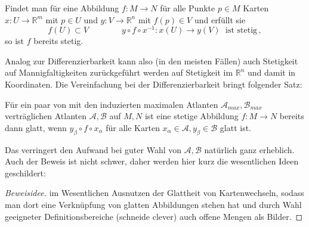 \documentclass[../H_Analysis_main.tex]{subfiles}
\begin{document}
\begin{satz}
Findet man für eine Abbildung $f: M \rightarrow N$ für alle Punkte $p \in M$ Karten $x: U \rightarrow \mathbb{R}^m$ mit $p \in U$ und $y: V \rightarrow \mathbb{R}^n$ mit $f(p) \in V$ und erfüllt sie
\begin{equation}
f(U) \subset V \qquad \qquad y \circ f \circ x^{-1}: x(U) \rightarrow y(V) \; \text{ ist stetig} \, ,
\end{equation}
so ist $f$ bereits stetig.
\end{satz}
Analog zur Differenzierbarkeit kann also (in den meisten Fällen) auch Stetigkeit auf Mannigfaltigkeiten zurückgeführt werden auf Stetigkeit im $\mathbb{R}^n$ und damit in Koordinaten. Die Vereinfachung bei der Differenzierbarkeit bringt folgender Satz:
\begin{satz}
Für ein paar von mit den induzierten maximalen Atlanten $\mathcal{A}_{max}, \mathcal{B}_{max}$ verträglichen Atlanten $\mathcal{A}, \mathcal{B}$ auf $M, N$ ist eine stetige Abbildung $f: M \rightarrow N$ bereits dann glatt, wenn $y_\beta \circ f \circ x_\alpha$ für alle Karten $x_\alpha \in \mathcal{A}, y_\beta \in \mathcal{B}$ glatt ist.%
\end{satz}
Das verringert den Aufwand bei guter Wahl von $\mathcal{A}, \mathcal{B}$ natürlich ganz erheblich. Auch der Beweis ist nicht schwer, daher werden hier kurz die wesentlichen Ideen geschildert:
\begin{proof}[Beweisidee]
im Wesentlichen Ausnutzen der Glattheit von Kartenwechseln, sodass man dort eine Verknüpfung von glatten Abbildungen stehen hat und durch Wahl geeigneter Definitionsbereiche (schneide clever) auch offene Mengen als Bilder.
\end{proof}
\end{document}
